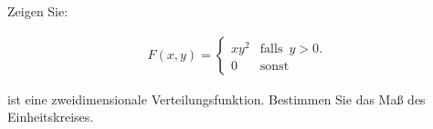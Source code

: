 \begin{exercise}

Zeigen Sie:

\begin{align*}
  F(x, y) =
  \begin{cases}
    x y^2 & \text{falls} \enspace y > 0. \\
    0     & \text{sonst}
  \end{cases}
\end{align*}

ist eine zweidimensionale Verteilungsfunktion. Bestimmen Sie das Maß des Einheitskreises.

\end{exercise}


